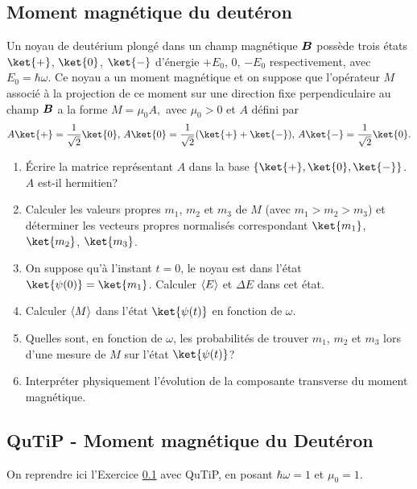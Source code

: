 \subsection{Moment magnétique du deutéron}
\label{sec:deuteron}

Un noyau de deutérium plongé dans un champ magnétique $\boldsymbol{B}$ possède trois 
états $\ket{+}$, $\ket{0} $, $\ket{-}$ d'énergie $+E_0$, $0$, $-E_0$ 
respectivement, avec $E_0=\hbar\omega$. Ce noyau a un moment magnétique et on 
suppose que l'opérateur $M$ associé à la projection de ce moment sur une 
direction fixe perpendiculaire au champ $\boldsymbol{B}$ a la forme $M=\mu_0A,$ avec 
$\mu_0>0$ et $A$ défini par%
\begin{equation}
A\ket{+}=\frac{1}{\sqrt{2}}\ket{0},\,A\ket{0}=\frac{1}{\sqrt{2}}(\ket{+}+\ket{-}
),\,A\ket{-} =\frac{1}{\sqrt{2}}\ket{0} .
\end{equation}

\begin{enumerate}
\item Écrire la matrice représentant $A$ dans la base $\{\ket{+},\ket{0},\ket{-}
\}$. $A$ est-il hermitien?

\item Calculer les valeurs propres $m_1$, $m_2$ et $m_3$ de $M$ (avec
$m_1>m_2>m_3$) et déterminer les vecteurs propres normalisés correspondant 
$\ket{m_1}$, $\ket{m_2}$, $\ket{m_3}$.

\item On suppose qu'à l'instant $t=0$, le noyau est dans l'état
$\ket{\psi(0)}=\ket{m_1}$. Calculer $\langle{E}\rangle$ et $\Delta E$ dans cet état.

\item Calculer $\langle{M}\rangle$ dans l'état $\ket{\psi(t)}$ en fonction de $\omega$.

\item Quelles sont, en fonction de $\omega$, les probabilités de trouver
$m_1$, $m_2$ et $m_3$ lors d'une mesure de $M$ sur l'état $\ket{\psi(t)}$?

\item Interpréter physiquement l'évolution de la composante transverse du
moment magnétique.
\end{enumerate}

\subsection{QuTiP - Moment magnétique du Deutéron}

On reprendre ici l'Exercice \ref{sec:deuteron} avec QuTiP, en posant 
$\hbar\omega=1$ et $\mu_0=1$.

